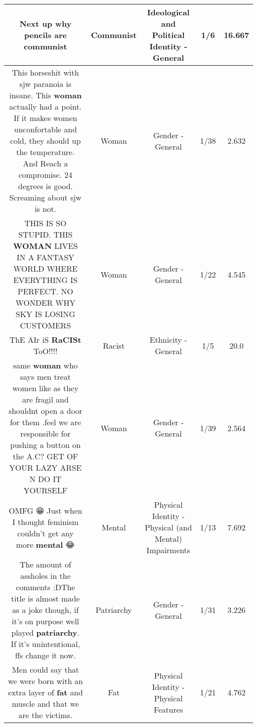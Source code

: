 \documentclass[11pt]{article}
\newlength\mylength
\begin{document}
\begin{center}
\begin{longtable}{|C{.65\mylength}|C{.30\mylength}|C{.12\mylength}|C{.12\mylength}|C{.12\mylength}|}
  \small Next up why pencils are communist\normalsize   & Communist &  Ideological and Political Identity - General & 1/6 & 16.667 \\  \hline
  \small This horseshit with sjw paranoia is insane. This \textbf{woman} actually had a point. If it makes women unconfortable and cold, they should up the temperature. And Reach a compromise. 24 degrees is good. Screaming about sjw is not.\normalsize   & Woman & Gender - General & 1/38 & 2.632 \\  \hline
  \small THIS IS SO STUPID. THIS \textbf{WOMAN} LIVES IN A FANTASY WORLD WHERE EVERYTHING IS PERFECT.  NO WONDER WHY SKY IS LOSING CUSTOMERS\normalsize   & Woman & Gender - General & 1/22 & 4.545 \\  \hline
  \small ThE AIr iS \textbf{RaCISt} ToO!!!!\normalsize   & Racist & Ethnicity - General & 1/5 & 20.0 \\  \hline
  \small same \textbf{woman} who says men treat women like  as they are fragil and shouldnt open a door for them .feel we  are responsible for pushing a button on the A.C? GET OF YOUR LAZY ARSE N DO IT YOURSELF\normalsize   & Woman & Gender - General & 1/39 & 2.564 \\  \hline
  \small OMFG 😁 Just when I thought feminism couldn't get any more \textbf{mental} 😂\normalsize   & Mental & Physical Identity - Physical (and Mental) Impairments & 1/13 & 7.692 \\  \hline
  \small The amount of assholes in the comments :DThe title is almost made as a joke though, if it's on purpose well played \textbf{patriarchy}. If it's unintentional, ffs change it now.\normalsize   & Patriarchy & Gender - General & 1/31 & 3.226 \\  \hline
  \small Men could say that we were born with an extra layer of \textbf{fat} and muscle and that we are the victims.\normalsize   & Fat & Physical Identity - Physical Features & 1/21 & 4.762 \\  \hline

\end{longtable}
\end{center}
\end{document}
